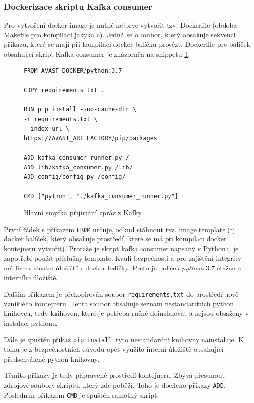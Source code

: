 \documentclass[thesis=M,czech,hidelinks]{FITthesis}[2013/05/06]
\begin{document}
\subsubsection{Dockerizace skriptu Kafka consumer} 
Pro vytvoření docker image je nutné nejprve vytvořit tzv. Dockerfile (obdoba Makefile pro kompilaci jakyka c). Jedná se o soubor, který obsahuje sekvenci příkazů, které se mají při kompilaci docker balíčku provézt. Dockerfile pro balíček obsahující skript Kafka consumer je znázorněn na snippetu \ref{snip:docker}.

\begin{figure}[h]               
	\begin{verbatim}
FROM AVAST_DOCKER/python:3.7

COPY requirements.txt .

RUN pip install --no-cache-dir \
-r requirements.txt \
--index-url \
https://AVAST_ARTIFACTORY/pip/packages

ADD kafka_consumer_runner.py /
ADD lib/kafka_consumer.py /lib/
ADD config/config.py /config/

CMD ["python", "./kafka_consumer_runner.py"]
	\end{verbatim}      
	\caption{Hlavní smyčka přijímání zpráv z Kafky}
	\label{snip:docker}
\end{figure}

První řádek s příkazem \texttt{FROM} určuje, odkud stáhnout tzv. image template (tj. docker balíček, který obsahuje prostředí, které se má při kompilaci docker kontejneru vytvořit). Protože je skript kafka consumer napsaný v Pythonu, je zapotřebí použít příslušný template. Kvůli bezpečnosti a pro zajištění integrity má firma vlastní úložiště s docker balíčky. Proto je balíček $python:3.7$ stažen z interního úložiště.

Dalším příkazem je překopírován soubor \texttt{requirements.txt} do prostředí nově vzniklého kontejneru. Tento soubor obsahuje seznam nestandardních python knihoven, tedy knihoven, které je potřeba ručně doinstalovat a nejsou obsaženy v instalaci pythonu.

Dále je spuštěn příkaz \texttt{pip install}, tyto nestandardní knihovny nainstaluje. K tomu je z bezpečnostních důvodů opět využito interní úložiště obsahující předschválené python knihovny.

Těmito příkazy je tedy připravené prostředí kontejneru. Zbývá přesunout zdrojové soubory skriptu, který zde poběží. Toho je docíleno příkazy \texttt{ADD}. Posledním příkazem \texttt{CMD} je spuštěn samotný skript.
\end{document}
